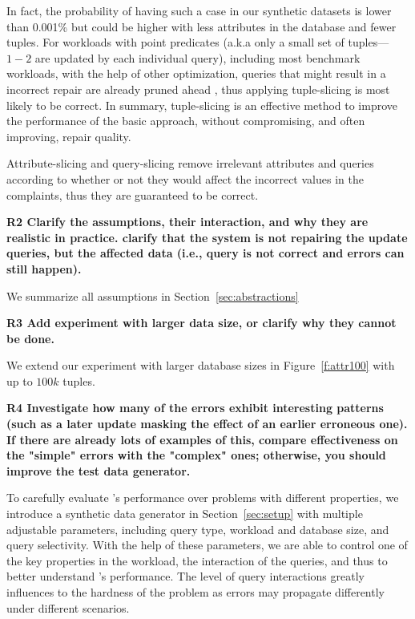 In fact, the probability of having such a case in our synthetic datasets is lower than 0.001\% but could be higher with less attributes in the database and fewer tuples. For workloads with point predicates (a.k.a only a small set of tuples---$1-2$ are updated by each individual query), including most benchmark workloads, with the help of other optimization, queries that might result in a incorrect repair are already pruned ahead , thus applying tuple-slicing is most likely to be correct. In summary, tuple-slicing is an effective method to improve the performance of the basic approach, without compromising, and often improving, repair quality.

Attribute-slicing and query-slicing remove irrelevant attributes and queries according to whether or not they would affect the incorrect values in the complaints, thus they are guaranteed to be correct. 

\noindent \textbf{R2 Clarify the assumptions, their interaction, and why they are realistic in practice. clarify that the system is not repairing the update queries, but the affected data (i.e., query is not correct and errors can still happen).} 

We summarize all assumptions in Section~\ref{sec:abstractions} 

\noindent \textbf{R3 Add experiment with larger data size, or clarify why they cannot be done.}

We extend our experiment with larger database sizes in Figure~\ref{f:attr100} with up to $100k$ tuples. 

\noindent \textbf{R4 Investigate how many of the errors exhibit interesting patterns (such as a later update masking the effect of an earlier erroneous one). If there are already lots of examples of this, compare effectiveness on the "simple" errors with the "complex" ones; otherwise, you should improve the test data generator.}

To carefully evaluate \sys's performance over problems with different properties, we introduce a synthetic data generator in Section~\ref{sec:setup} with multiple adjustable parameters, including query type, workload and database size, and query selectivity. 
With the help of these parameters, we are able to control one of the key properties in the workload, the interaction of the queries, 
and thus to better understand \sys's performance. The level of query interactions greatly influences to the hardness of the problem as errors may propagate differently under different scenarios. 

